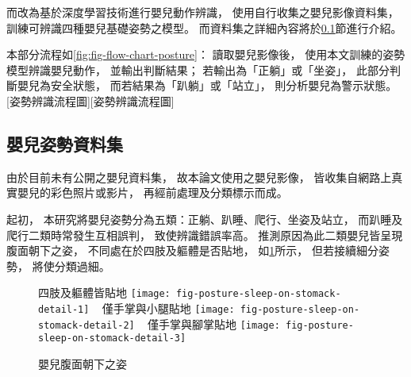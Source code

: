 \documentclass[class=NCU_thesis, crop=false]{standalone}
\begin{document}
而改為基於深度學習技術進行嬰兒動作辨識，
使用自行收集之嬰兒影像資料集，
訓練可辨識四種嬰兒基礎姿勢之模型。
而資料集之詳細內容將於\ref{sec:chapter_method_posture_dataset}節進行介紹。

本部分流程如\cref{fig:fig-flow-chart-posture}：
讀取嬰兒影像後，
使用本文訓練的姿勢模型辨識嬰兒動作，
並輸出判斷結果；
若輸出為「正躺」或「坐姿」，
此部分判斷嬰兒為安全狀態，
而若結果為「趴躺」或「站立」，
則分析嬰兒為警示狀態。
[姿勢辨識流程圖][姿勢辨識流程圖]

\subsection{嬰兒姿勢資料集}
\label{sec:chapter_method_posture_dataset}
由於目前未有公開之嬰兒資料集，
故本論文使用之嬰兒影像，
皆收集自網路上真實嬰兒的彩色照片或影片，
再經前處理及分類標示而成。

起初，
本研究將嬰兒姿勢分為五類：正躺、趴睡、爬行、坐姿及站立，
而趴睡及爬行二類時常發生互相誤判，
致使辨識錯誤率高。
推測原因為此二類嬰兒皆呈現腹面朝下之姿，
不同處在於四肢及軀體是否貼地，
如\cref{fig:fig-posture-sleep-on-stomack-detail}所示，
但若接續細分姿勢，
將使分類過細。
\begin{figure}[!hbt]
    \centering
    \subcaptionbox
        {四肢及軀體皆貼地
        \label{fig:fig-posture-sleep-on-stomack-detail-1}}
        {\texttt{[image: fig-posture-sleep-on-stomack-detail-1]}}
    ~
    \subcaptionbox
        {僅手掌與小腿貼地
        \label{fig:fig-posture-sleep-on-stomack-detail-2}}
        {\texttt{[image: fig-posture-sleep-on-stomack-detail-2]}}
    ~
    \subcaptionbox
        {僅手掌與腳掌貼地
        \label{fig:fig-posture-sleep-on-stomack-detail-3}}
        {\texttt{[image: fig-posture-sleep-on-stomack-detail-3]}}
    \caption{嬰兒腹面朝下之姿}
    \label{fig:fig-posture-sleep-on-stomack-detail}
\end{figure}
\end{document}

